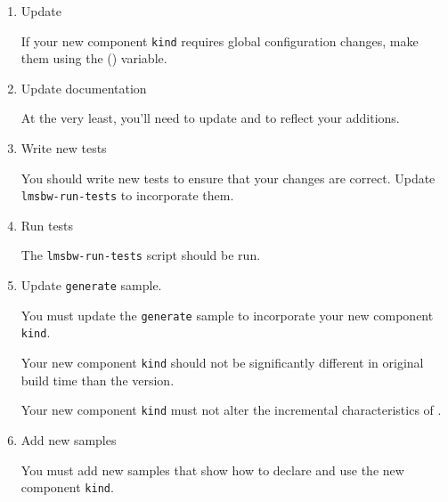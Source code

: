 \begin{enumerate}
\item Update \lmsbwconfiguration

  If your new component \texttt{kind} requires global configuration
  changes, make them using the \lmsbwconfiguration
  () variable.

\item Update documentation

  At the very least, you'll need to update  and
   to reflect your additions.

\item Write new tests

  You should write new tests to ensure that your changes are correct.
  Update \texttt{lmsbw-run-tests} to incorporate them.

\item Run tests

  The \texttt{lmsbw-run-tests} script should be run.

\item Update \texttt{generate} sample.

  You must update the \texttt{generate} sample to incorporate your
  new component \texttt{kind}.

  Your new component \texttt{kind} should not be significantly
  different in original build time than the \makefile version.

  Your new component \texttt{kind} must not alter the incremental
  characteristics of \lmsbw.

\item Add new samples

  You must add new samples that show how to declare and use the new
  component \texttt{kind}.

\end{enumerate}

